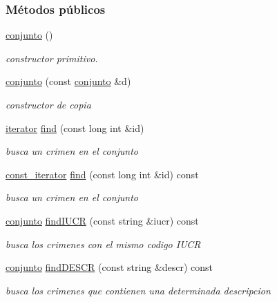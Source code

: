 \subsubsection*{Métodos públicos}
\begin{DoxyCompactItemize}
\item 
\hyperlink{classconjunto_a16d987f42c679efab01748178ba45891}{conjunto} ()
\begin{DoxyCompactList}\small\item\em constructor primitivo. \end{DoxyCompactList}\item 
\hyperlink{classconjunto_ab0944b1f9a0c959ca314ce0debd5def9}{conjunto} (const \hyperlink{classconjunto}{conjunto} \&d)
\begin{DoxyCompactList}\small\item\em constructor de copia \end{DoxyCompactList}\item 
\hyperlink{classconjunto_1_1iterator}{iterator} \hyperlink{classconjunto_a5db0b726eea4bd8163340e0c3e7ab427}{find} (const long int \&id)
\begin{DoxyCompactList}\small\item\em busca un crimen en el conjunto \end{DoxyCompactList}\item 
\hyperlink{classconjunto_1_1const__iterator}{const\-\_\-iterator} \hyperlink{classconjunto_a5c39803739685353f0cc1077ce1719d5}{find} (const long int \&id) const 
\begin{DoxyCompactList}\small\item\em busca un crimen en el conjunto \end{DoxyCompactList}\item 
\hyperlink{classconjunto}{conjunto} \hyperlink{classconjunto_a2ca2a7b59bce8369e9d9ccc1c7be9614}{find\-I\-U\-C\-R} (const string \&iucr) const 
\begin{DoxyCompactList}\small\item\em busca los crimenes con el mismo codigo I\-U\-C\-R \end{DoxyCompactList}\item 
\hyperlink{classconjunto}{conjunto} \hyperlink{classconjunto_afff3e7f4b3d00f422dd7ab2fec935378}{find\-D\-E\-S\-C\-R} (const string \&descr) const 
\begin{DoxyCompactList}\small\item\em busca los crimenes que contienen una determinada descripcion \end{DoxyCompactList}\item 

\end{DoxyCompactItemize}

